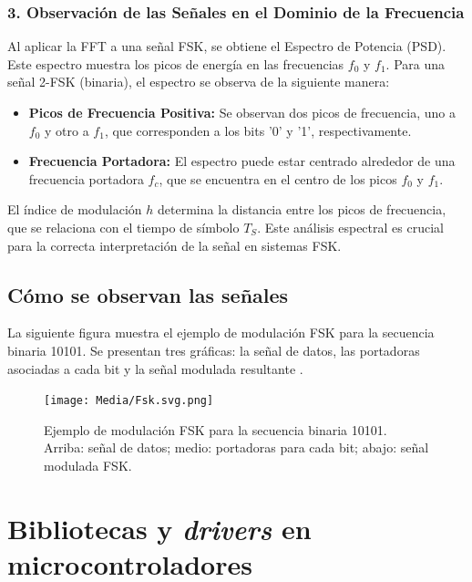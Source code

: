 \documentclass[letter,12pt]{article}
\begin{document}
\subsubsection{3. Observación de las Señales en el Dominio de la Frecuencia}

Al aplicar la FFT a una señal FSK, se obtiene el Espectro de Potencia (PSD). Este espectro muestra los picos de energía en las frecuencias \( f_0 \) y \( f_1 \). Para una señal 2-FSK (binaria), el espectro se observa de la siguiente manera:

\begin{itemize}
    \item \textbf{Picos de Frecuencia Positiva:} Se observan dos picos de frecuencia, uno a \( f_0 \) y otro a \( f_1 \), que corresponden a los bits '0' y '1', respectivamente.
    \item \textbf{Frecuencia Portadora:} El espectro puede estar centrado alrededor de una frecuencia portadora \( f_c \), que se encuentra en el centro de los picos \( f_0 \) y \( f_1 \).
\end{itemize}
  
El índice de modulación \( h \) determina la distancia entre los picos de frecuencia, que se relaciona con el tiempo de símbolo \( T_S \). Este análisis espectral es crucial para la correcta interpretación de la señal en sistemas FSK.

\subsection{Cómo se observan las señales}

La siguiente figura muestra el ejemplo de modulación FSK para la secuencia binaria 10101. Se presentan tres gráficas: la señal de datos, las portadoras asociadas a cada bit y la señal modulada resultante \cite{Ktims2006}.

\begin{figure}[H]
  \centering
  \texttt{[image: Media/Fsk.svg.png]}
  \caption{Ejemplo de modulación FSK para la secuencia binaria 10101. Arriba: señal de datos; medio: portadoras para cada bit; abajo: señal modulada FSK. \cite{Ktims2006}}
  \label{fig:fsk-ejemplo}
\end{figure}

\section{Bibliotecas y \emph{drivers} en microcontroladores}
\end{document}
